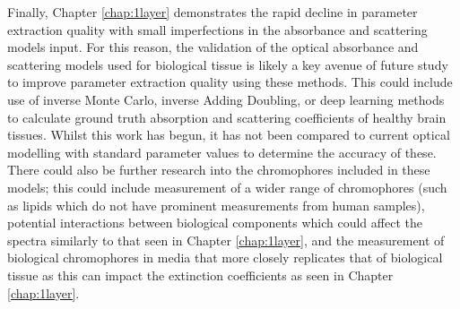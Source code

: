 Finally, Chapter \ref{chap:1layer} demonstrates the rapid decline in parameter extraction quality with small imperfections in the absorbance and scattering models input. For this reason, the validation of the optical absorbance and scattering models used for biological tissue is likely a key avenue of future study to improve parameter extraction quality using these methods. This could include use of inverse Monte Carlo, inverse Adding Doubling, or deep learning methods to calculate ground truth absorption and scattering coefficients of healthy brain tissues. Whilst this work has begun, it has not been compared to current optical modelling with standard parameter values to determine the accuracy of these\cite{Sabino2016, Eggert1987, Shapey2022, Hokr2021}. There could also be further research into the chromophores included in these models; this could include measurement of a wider range of chromophores (such as lipids which do not have prominent measurements from human samples), potential interactions between biological components which could affect the spectra similarly to that seen in Chapter \ref{chap:1layer}, and the measurement of biological chromophores in media that more closely replicates that of biological tissue as this can impact the extinction coefficients as seen in Chapter \ref{chap:1layer}.